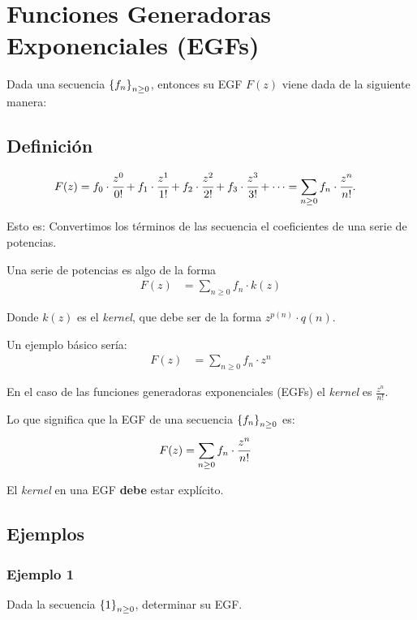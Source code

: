 \section{Funciones Generadoras Exponenciales (EGFs)}

Dada una secuencia $\left\{f_n\right\}_{n\geq0}$, entonces su EGF $F(z)$ viene dada de la siguiente manera:

\subsection{Definición}

\begin{align*}
F(z)&=f_0\cdot\cfrac{z^{0}}{0!}+f_1\cdot\cfrac{z^{1}}{1!}+f_2\cdot\cfrac{z^{2}}{2!}+f_3\cdot\cfrac{z^{3}}{3!}+\cdots=\sum_{n\geq0}{f_n\cdot \cfrac{z^{n}}{n!}}.
\end{align*}

Esto es: Convertimos los términos de las secuencia el coeficientes de una serie de potencias.

Una serie de potencias es algo de la forma
\begin{align*}
F(z)&=\sum_{n\geq0}{f_n\cdot k(z)}
\end{align*}

Donde $k(z)$ es el \textit{kernel}, que debe ser de la forma $z^{p(n)}\cdot q(n)$.

Un ejemplo básico sería:
\begin{align*}
F(z)&=\sum_{n\geq0}{f_n\cdot z^n}
\end{align*}

En el caso de las funciones generadoras exponenciales (EGFs) el \textit{kernel} es
$\frac{z^n}{n!}$.

Lo que significa que la EGF de una secuencia $\left\{f_n\right\}_{n\geq0}$ es:
\begin{align*}
F(z)&=\sum_{n\geq0}{f_n\cdot \cfrac{z^{n}}{n!}}
\end{align*}

El \textit{kernel} en una EGF \textbf{debe} estar explícito.

\subsection{Ejemplos}

\subsubsection{Ejemplo 1}

Dada la secuencia $\left\{1\right\}_{n\geq0}$, determinar su EGF. 

